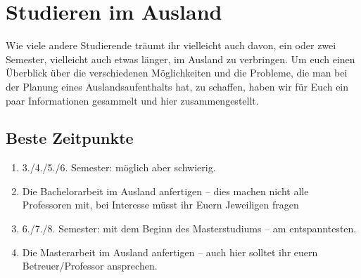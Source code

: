 \section{Studieren im Ausland}
\label{sec:ausland}
Wie viele andere Studierende träumt ihr vielleicht auch davon, ein oder zwei Semester, vielleicht auch etwas länger, im Ausland zu verbringen. Um euch einen Überblick über die verschiedenen Möglichkeiten und die Probleme, die man bei der Planung eines Auslandsaufenthalts hat, zu schaffen, haben wir für Euch ein paar Informationen gesammelt und hier zusammengestellt.

\subsection{Beste Zeitpunkte}
\begin{enumerate}
	\item 3./4./5./6. Semester: möglich aber schwierig.
	\item Die Bachelorarbeit im Ausland anfertigen -- dies machen nicht alle Professoren mit, bei Interesse müsst ihr Euern Jeweiligen fragen
	\item 6./7./8. Semester: mit dem Beginn des Masterstudiums -- am entspanntesten.
	\item Die Masterarbeit im Ausland anfertigen -- auch hier solltet ihr euern Betreuer/Professor ansprechen.
\end{enumerate}

